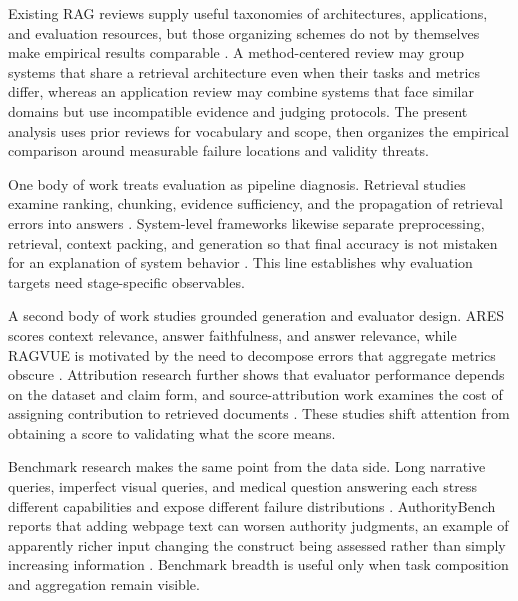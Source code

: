 \documentclass[a4paper,11pt]{article}
\begin{document}
Existing RAG reviews supply useful taxonomies of architectures, applications, and evaluation resources, but those organizing schemes do not by themselves make empirical results comparable \citep{Salemi2024Evaluating,Belo2026Systematic,Zhou2024Trustworthiness}. A method-centered review may group systems that share a retrieval architecture even when their tasks and metrics differ, whereas an application review may combine systems that face similar domains but use incompatible evidence and judging protocols. The present analysis uses prior reviews for vocabulary and scope, then organizes the empirical comparison around measurable failure locations and validity threats.

One body of work treats evaluation as pipeline diagnosis. Retrieval studies examine ranking, chunking, evidence sufficiency, and the propagation of retrieval errors into answers \citep{Taiwo2026Evaluating,Belinchon2026Effect}. System-level frameworks likewise separate preprocessing, retrieval, context packing, and generation so that final accuracy is not mistaken for an explanation of system behavior \citep{Muthyam2026Systems}. This line establishes why evaluation targets need stage-specific observables.

A second body of work studies grounded generation and evaluator design. ARES scores context relevance, answer faithfulness, and answer relevance, while RAGVUE is motivated by the need to decompose errors that aggregate metrics obscure \citep{SaadFalcon2023Ares,Murugaraj2025Ragvue}. Attribution research further shows that evaluator performance depends on the dataset and claim form, and source-attribution work examines the cost of assigning contribution to retrieved documents \citep{Ding2026Attribution,Nematov2025Source}. These studies shift attention from obtaining a score to validating what the score means.

Benchmark research makes the same point from the data side. Long narrative queries, imperfect visual queries, and medical question answering each stress different capabilities and expose different failure distributions \citep{Upadhyay2026Overview,Zhang2026Before,Li2026Mrag}. AuthorityBench reports that adding webpage text can worsen authority judgments, an example of apparently richer input changing the construct being assessed rather than simply increasing information \citep{Yao2026Authoritybench}. Benchmark breadth is useful only when task composition and aggregation remain visible.
\end{document}
